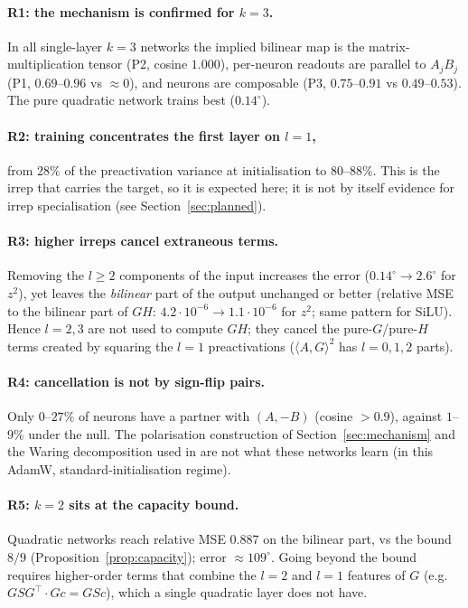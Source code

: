 \documentclass[a4paper,11pt]{article}
\theoremstyle{remark}
\theoremstyle{definition}
\newcommand{\ip}[2]{\langle #1, #2 \rangle}
\begin{document}
\paragraph{R1: the mechanism is confirmed for $k=3$.} In all single-layer
$k=3$ networks the implied bilinear map is the matrix-multiplication tensor
(P2, cosine $1.000$), per-neuron readouts are parallel to $A_jB_j$
(P1, $0.69$--$0.96$ vs $\approx0$), and neurons are composable (P3, $0.75$--$0.91$
vs $0.49$--$0.53$). The pure quadratic network trains best ($0.14^\circ$).

\paragraph{R2: training concentrates the first layer on $l=1$,} from $28\%$ of
the preactivation variance at initialisation to $80$--$88\%$. This is the irrep that carries
the target, so it is expected here; it is not by itself evidence for irrep
specialisation (see Section~\ref{sec:planned}).

\paragraph{R3: higher irreps cancel extraneous terms.} Removing the $l\ge2$
components of the input increases the error ($0.14^\circ\to2.6^\circ$ for $z^2$),
yet leaves the \emph{bilinear} part of the output unchanged or better
(relative MSE to the bilinear part of $GH$: $4.2\cdot10^{-6}\to1.1\cdot10^{-6}$
for $z^2$; same pattern for SiLU). Hence $l=2,3$ are not used to
compute $GH$; they cancel the pure-$G$/pure-$H$ terms created by squaring the
$l=1$ preactivations ($\ip{A}{G}^2$ has $l=0,1,2$ parts).

\paragraph{R4: cancellation is not by sign-flip pairs.} Only $0$--$27\%$ of
neurons have a partner with $(A,-B)$ (cosine $>0.9$), against $1$--$9\%$ under the
null. The polarisation construction of Section~\ref{sec:mechanism} and the
Waring decomposition used in \cite{marchetti2026sequential} are not what these
networks learn (in this AdamW, standard-initialisation regime).

\paragraph{R5: $k=2$ sits at the capacity bound.} Quadratic networks reach
relative MSE $0.887$ on the bilinear part, vs the bound $8/9$
(Proposition~\ref{prop:capacity}); error $\approx109^\circ$. Going beyond the
bound requires higher-order terms that combine the $l=2$ and $l=1$ features of $G$
(e.g.\ $GSG^\top\cdot Gc=GSc$), which a single quadratic layer does not have.
\end{document}
